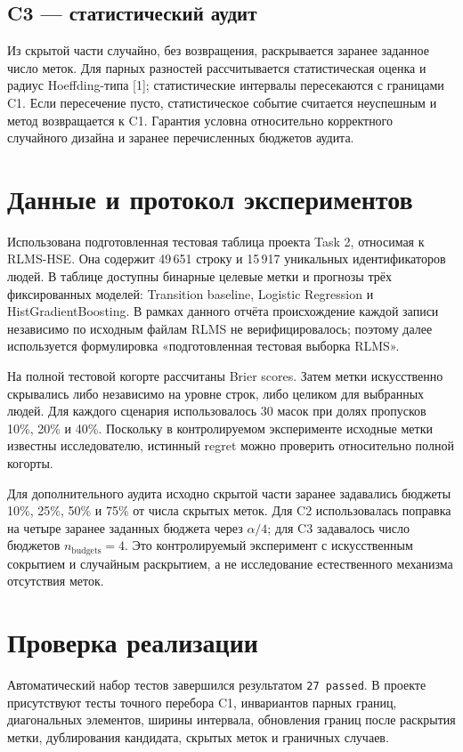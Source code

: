 \documentclass[12pt,a4paper]{article}
\begin{document}
\subsection{C3 --- статистический аудит}
Из скрытой части случайно, без возвращения, раскрывается заранее заданное число меток. Для парных разностей рассчитывается статистическая оценка и радиус Hoeffding-типа [1]; статистические интервалы пересекаются с границами C1. Если пересечение пусто, статистическое событие считается неуспешным и метод возвращается к C1. Гарантия условна относительно корректного случайного дизайна и заранее перечисленных бюджетов аудита.

\section{Данные и протокол экспериментов}
Использована подготовленная тестовая таблица проекта Task 2, относимая к RLMS-HSE. Она содержит 49\,651 строку и 15\,917 уникальных идентификаторов людей. В таблице доступны бинарные целевые метки и прогнозы трёх фиксированных моделей: Transition baseline, Logistic Regression и HistGradientBoosting. В рамках данного отчёта происхождение каждой записи независимо по исходным файлам RLMS не верифицировалось; поэтому далее используется формулировка «подготовленная тестовая выборка RLMS».

На полной тестовой когорте рассчитаны Brier scores. Затем метки искусственно скрывались либо независимо на уровне строк, либо целиком для выбранных людей. Для каждого сценария использовалось 30 масок при долях пропусков 10\%, 20\% и 40\%. Поскольку в контролируемом эксперименте исходные метки известны исследователю, истинный regret можно проверить относительно полной когорты.

Для дополнительного аудита исходно скрытой части заранее задавались бюджеты 10\%, 25\%, 50\% и 75\% от числа скрытых меток. Для C2 использовалась поправка на четыре заранее заданных бюджета через $\alpha/4$; для C3 задавалось число бюджетов $n_{\text{budgets}}=4$. Это контролируемый эксперимент с искусственным сокрытием и случайным раскрытием, а не исследование естественного механизма отсутствия меток.

\section{Проверка реализации}
Автоматический набор тестов завершился результатом \texttt{27 passed}. В проекте присутствуют тесты точного перебора C1, инвариантов парных границ, диагональных элементов, ширины интервала, обновления границ после раскрытия метки, дублирования кандидата, скрытых меток и граничных случаев.
\end{document}
